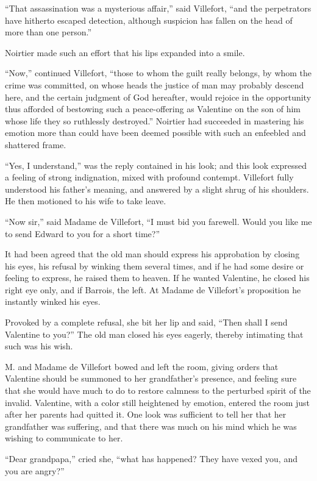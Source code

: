 “That assassination was a mysterious affair,” said Villefort, “and the
perpetrators have hitherto escaped detection, although suspicion has
fallen on the head of more than one person.”

Noirtier made such an effort that his lips expanded into a smile.

“Now,” continued Villefort, “those to whom the guilt really belongs, by
whom the crime was committed, on whose heads the justice of man may
probably descend here, and the certain judgment of God hereafter, would
rejoice in the opportunity thus afforded of bestowing such a
peace-offering as Valentine on the son of him whose life they so
ruthlessly destroyed.” Noirtier had succeeded in mastering his emotion
more than could have been deemed possible with such an enfeebled and
shattered frame.

“Yes, I understand,” was the reply contained in his look; and this look
expressed a feeling of strong indignation, mixed with profound
contempt. Villefort fully understood his father’s meaning, and answered
by a slight shrug of his shoulders. He then motioned to his wife to
take leave.

“Now sir,” said Madame de Villefort, “I must bid you farewell. Would
you like me to send Edward to you for a short time?”

It had been agreed that the old man should express his approbation by
closing his eyes, his refusal by winking them several times, and if he
had some desire or feeling to express, he raised them to heaven. If he
wanted Valentine, he closed his right eye only, and if Barrois, the
left. At Madame de Villefort’s proposition he instantly winked his
eyes.

Provoked by a complete refusal, she bit her lip and said, “Then shall I
send Valentine to you?” The old man closed his eyes eagerly, thereby
intimating that such was his wish.

M. and Madame de Villefort bowed and left the room, giving orders that
Valentine should be summoned to her grandfather’s presence, and feeling
sure that she would have much to do to restore calmness to the
perturbed spirit of the invalid. Valentine, with a color still
heightened by emotion, entered the room just after her parents had
quitted it. One look was sufficient to tell her that her grandfather
was suffering, and that there was much on his mind which he was wishing
to communicate to her.

“Dear grandpapa,” cried she, “what has happened? They have vexed you,
and you are angry?”

